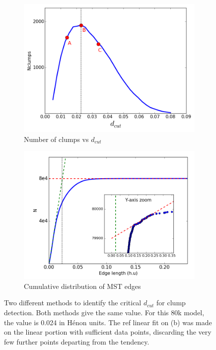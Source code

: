  \begin{figure}
\center
    \centering
    \begin{subfigure}[b]{0.49\textwidth}
    	\centering
    	\includegraphics[width=\textwidth]{Figures/2_Ndcut.png}
        \caption{Number of clumps vs $d_{cut}$}
        \label{Fig:2_Ndcut}
    \end{subfigure}
    \begin{subfigure}[b]{0.49\textwidth}
    	\centering
    	\includegraphics[width=\textwidth]{Figures/2_dcutdistribution.png}
        \caption{Cumulative distribution of MST edges}
        \label{Fig:2_dcutcumulated}
    \end{subfigure}
\caption{Two different methods to identify the critical $d_{cut}$ for clump detection. Both methods give the same value. For this 80k model, the value is 0.024 in H\'enon units. The ref linear fit on (b) was made on the linear portion with sufficient data points, discarding the very few further points departing from the tendency.}
\label{Fig:0_dcutchoice}
\end{figure}


